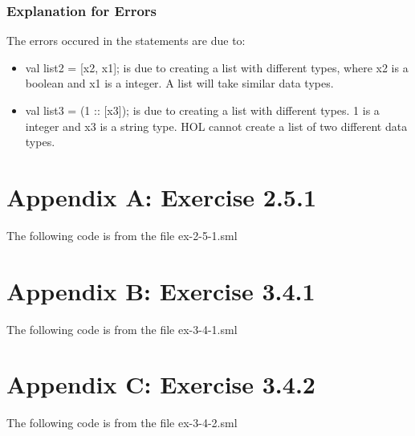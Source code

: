 \documentclass{report}
\begin{document}
\subsection{Explanation for Errors}
The errors occured in the statements are due to:
\begin{itemize}
\item val list2 = [x2, x1]; is due to creating a list with different types,
where x2 is a boolean and x1 is a integer. A list will take similar
data types.
\item val list3 = (1 :: [x3]); is due to creating a list with different types. 1 is a integer and x3 is a string type. HOL cannot create a list of two different data types.
\end{itemize}

\chapter{Appendix A: Exercise 2.5.1}
\label{cha:appendix-a:-exercise}

The following code is from the file ex-2-5-1.sml



\chapter{Appendix B: Exercise 3.4.1}
\label{cha:appendix-b:-exercise}

The following code is from the file ex-3-4-1.sml


\chapter{Appendix C: Exercise 3.4.2}
\label{cha:appendix-c:-exercise}

The following code is from the file ex-3-4-2.sml

\end{document}
